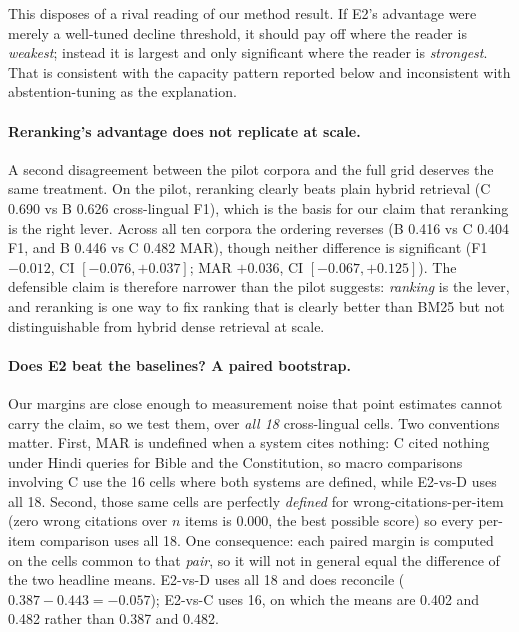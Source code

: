 \documentclass[11pt]{article}
\begin{document}
This disposes of a rival reading of our method result. If E2's
advantage were merely a well-tuned decline threshold, it should pay off where the
reader is \emph{weakest}; instead it is largest and only significant where the
reader is \emph{strongest}. That is consistent with the capacity pattern reported
below and inconsistent with abstention-tuning as the explanation.

\paragraph{Reranking's advantage does not replicate at scale.} A second
disagreement between the pilot corpora and the full grid deserves the same
treatment. On the pilot, reranking clearly beats plain hybrid retrieval (C 0.690
vs B 0.626 cross-lingual F1), which is the basis for our claim that reranking is
the right lever. Across all ten corpora the ordering reverses (B 0.416 vs C
0.404 F1, and B 0.446 vs C 0.482 MAR), though neither difference is significant
(F1 $-0.012$, CI $[-0.076,+0.037]$; MAR $+0.036$, CI $[-0.067,+0.125]$). The
defensible claim is therefore narrower than the pilot suggests: \emph{ranking} is
the lever, and reranking is one way to fix ranking that is clearly better than
BM25 but not distinguishable from hybrid dense retrieval at scale.

\paragraph{Does E2 beat the baselines? A paired bootstrap.} Our margins are close
enough to measurement noise that point estimates cannot carry the claim, so we
test them, over \emph{all 18} cross-lingual cells. Two conventions matter. First, MAR is undefined when
a system cites nothing: C cited nothing under Hindi queries for Bible and the
Constitution, so macro comparisons involving C use the 16 cells where both
systems are defined, while E2-vs-D uses all 18. Second, those same cells are
perfectly \emph{defined} for wrong-citations-per-item (zero wrong citations over
$n$ items is $0.000$, the best possible score) so every per-item comparison uses
all 18. One consequence: each paired margin is computed on the cells common to that
\emph{pair}, so it will not in general equal the difference of the two headline
means. E2-vs-D uses all 18 and does reconcile ($0.387-0.443=-0.057$); E2-vs-C
uses 16, on which the means are 0.402 and 0.482 rather than 0.387 and 0.482.
\end{document}
